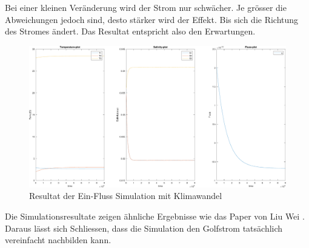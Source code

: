 
Bei einer kleinen Veränderung wird der Strom nur schwächer. Je grösser die Abweichungen jedoch sind, desto stärker wird der Effekt.
Bis sich die Richtung des Stromes ändert.
Das Resultat entspricht also den Erwartungen. 

\begin{figure}
	\centering
	\includegraphics[width=14cm]{thermohalin/Code/graphs/3b1f-skript-klimawandel.pdf}
	\caption{Resultat der Ein-Fluss Simulation mit Klimawandel}
	\label{thermohalin:3b1f-skript-klimawandel}
\end{figure}
Die Simulationsresultate zeigen ähnliche Ergebnisse wie das Paper von Liu Wei \cite{thermohalin:liuwei}. Daraus lässt sich Schliessen, dass die Simulation den Golfstrom tatsächlich vereinfacht nachbilden kann.


